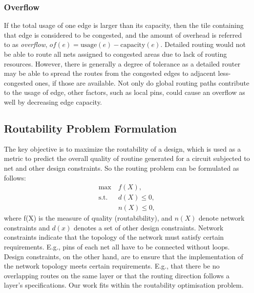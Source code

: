 \subsubsection{Overflow}
If the total usage of one edge is larger than its capacity, then the tile containing that edge is considered to be congested, and the amount of overhead is referred to as {\it overflow}, $of(e)=\text{usage}(e)-\text{capacity}(e)$. Detailed routing would not be able to route all nets assigned to congested areas due to lack of routing resources. However, there is generally a degree of tolerance as a detailed router may be able to spread the routes from the congested edges to adjacent less-congested ones, if those are available. Not only do global routing paths contribute to the usage of edge, other factors, such as local pins, could cause an overflow as well by decreasing edge capacity.

\subsection{Routability Problem Formulation}
The key objective is to maximize the routability of a design, which is used as a metric to predict the overall quality of routine generated for a  circuit subjected to net and other design constraints.
So the routing problem can be formulated as follows:
\begin{subequations}
\begin{align*}
    \max  \       & f(X), \\
    \text{s.t.}~~ & d(X) \leq 0, \\
                  & n(X) \leq 0,
\end{align*}
\end{subequations}
where f(X) is the measure of quality (routabibility), and $n(X)$ denote network constraints and $d(x)$ denotes a set of other design constraints.  Network constraints indicate that the topology of the network must satisfy certain requirements.  E.g., pins of each net all have to be  connected without loops. Design constraints, on the other hand, are to ensure that the implementation of the network topology meets certain requirements. E.g., that there be no overlapping routes on the same layer or that the routing direction follows a layer's specifications. Our work fits within the routability optimisation problem.

